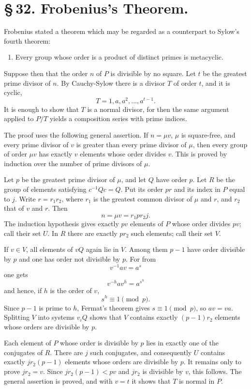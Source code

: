 \documentclass[11pt]{article}
\begin{document}
\section*{\S\,32. Frobenius's Theorem.}

Frobenius stated a theorem which may be regarded as a counterpart to Sylow's fourth theorem:
\begin{enumerate}[label=\Roman*.,leftmargin=2.4em,start=5]
\item Every group whose order is a product of distinct primes is metacyclic.
\end{enumerate}
Suppose then that the order $n$ of $P$ is divisible by no square. Let $t$ be the greatest prime divisor of $n$. By Cauchy-Sylow there is a divisor $T$ of order $t$, and it is cyclic,
\[
T=1,a,a^2,\ldots,a^{t-1}.
\]
It is enough to show that $T$ is a normal divisor, for then the same argument applied to $P/T$ yields a composition series with prime indices.

The proof uses the following general assertion. If $n=\mu v$, $\mu$ is square-free, and every prime divisor of $v$ is greater than every prime divisor of $\mu$, then every group of order $\mu v$ has exactly $v$ elements whose order divides $v$. This is proved by induction over the number of prime divisors of $\mu$.

Let $p$ be the greatest prime divisor of $\mu$, and let $Q$ have order $p$. Let $R$ be the group of elements satisfying $c^{-1}Qc=Q$. Put its order $pr$ and its index in $P$ equal to $j$. Write $r=r_1r_2$, where $r_1$ is the greatest common divisor of $\mu$ and $r$, and $r_2$ that of $v$ and $r$. Then
\[
n=\mu v=r_1 p r_2 j.
\]
The induction hypothesis gives exactly $pv$ elements of $P$ whose order divides $pv$; call their set $U$. In $R$ there are exactly $pr_2$ such elements; call their set $V$.

If $v\in V$, all elements of $vQ$ again lie in $V$. Among them $p-1$ have order divisible by $p$ and one has order not divisible by $p$. For from
\[
v^{-1}av=a^s
\tag{1}
\]
one gets
\[
v^{-h}av^h=a^{s^h}
\tag{2}
\]
and hence, if $h$ is the order of $v$,
\[
s^h\equiv1\pmod p.
\tag{3}
\]
Since $p-1$ is prime to $h$, Fermat's theorem gives $s\equiv1\pmod p$, so $av=va$. Splitting $V$ into systems $v_iQ$ shows that $V$ contains exactly $(p-1)r_2$ elements whose orders are divisible by $p$.

Each element of $P$ whose order is divisible by $p$ lies in exactly one of the conjugates of $R$. There are $j$ such conjugates, and consequently $U$ contains exactly $jr_2(p-1)$ elements whose orders are divisible by $p$. It remains only to prove $jr_2=v$. Since $jr_2(p-1)<pv$ and $jr_2$ is divisible by $v$, this follows. The general assertion is proved, and with $v=t$ it shows that $T$ is normal in $P$.
\end{document}
